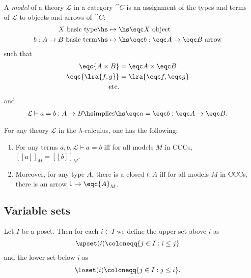 \documentclass{article}
\begin{document}
\begin{definition}[Awodey p. 138]
	A \emph{model} of a theory $\mathcal{L}$ in a category $\cat C$
	is an assignment of the types and terms of $\mathcal{L}$ to objects
	and arrows of $\cat C$:
	\begin{align*}
		X\text{ basic type} \hs
		 & \mapsto\hs\eqc X \text{ object}                   \\
		b:A\to B\text{ basic term} \hs
		 & \mapsto\hs \eqc b: \eqc A \to \eqc B\text{ arrow}
	\end{align*}
	such that
	\begin{align*}
		\eqc{A\times B} & = \eqc A \times \eqc B \\
		\eqc{\lra{f,g}} & = \lra{\eqc f, \eqc g} \\
		\text{etc.}
	\end{align*}
	and
	\begin{align*}
		\mathcal{L}\vdash a = b : A \to B \hs\text{implies}\hs
		\eqc a = \eqc b : \eqc A \to \eqc B.
	\end{align*}
\end{definition}

\begin{proposition}[Awodey p. 139]
	For any theory $\mathcal{L}$ in the $\lambda$-calculus, one has the
	following:
	\begin{enumerate}
		\item For any terms $a,b,\mathcal{L}\vdash a = b$ iff
		      for all models $M$ in CCCs, $[\![a]\!]_M=[\![b]\!]_M$.
		\item Moreover, for any type $A$, there is a closed $t:A$ iff for all models $M$ in CCCs, there is an arrow $1\to\eqc{A}_M$.
	\end{enumerate}
\end{proposition}

\subsection{Variable sets}

\begin{definition}
	Let $I$ be a poset. Then for each $i\in I$ we define
	the upper set above $i$ as
	\begin{align*}
		\upset(i) \coloneqq \{j\in I : i\leq j\}
	\end{align*}
	and the lower set below $i$ as
	\begin{align*}
		\loset(i) \coloneqq \{j\in I : j\leq i\}.
	\end{align*}
\end{definition}
\end{document}
